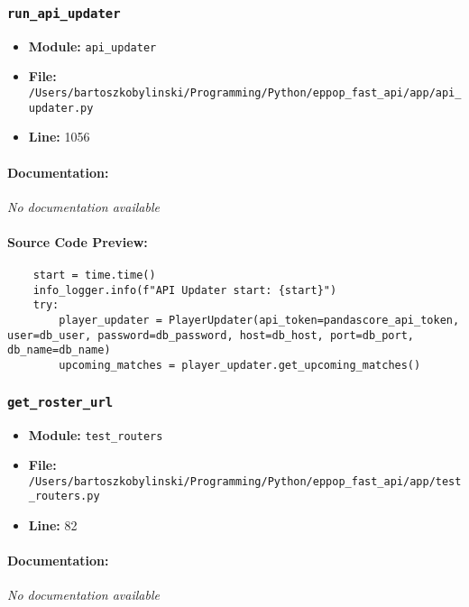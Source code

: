 \documentclass[11pt,a4paper]{article}
\begin{document}
\vspace{1em}
\subsubsection{\texttt{run\_api\_updater}}

\begin{itemize}
    \item \textbf{Module:} \texttt{api\_updater}
    \item \textbf{File:} \texttt{/Users/bartoszkobylinski/Programming/Python/eppop\_fast\_api/app/api\_updater.py}
    \item \textbf{Line:} 1056
\end{itemize}

\paragraph{Documentation:} \textit{No documentation available}

\paragraph{Source Code Preview:}
\begin{verbatim}
    start = time.time()
    info_logger.info(f"API Updater start: {start}")
    try:
        player_updater = PlayerUpdater(api_token=pandascore_api_token, user=db_user, password=db_password, host=db_host, port=db_port, db_name=db_name)
        upcoming_matches = player_updater.get_upcoming_matches()
\end{verbatim}

\vspace{1em}
\subsubsection{\texttt{get\_roster\_url}}

\begin{itemize}
    \item \textbf{Module:} \texttt{test\_routers}
    \item \textbf{File:} \texttt{/Users/bartoszkobylinski/Programming/Python/eppop\_fast\_api/app/test\_routers.py}
    \item \textbf{Line:} 82
\end{itemize}

\paragraph{Documentation:} \textit{No documentation available}
\end{document}
